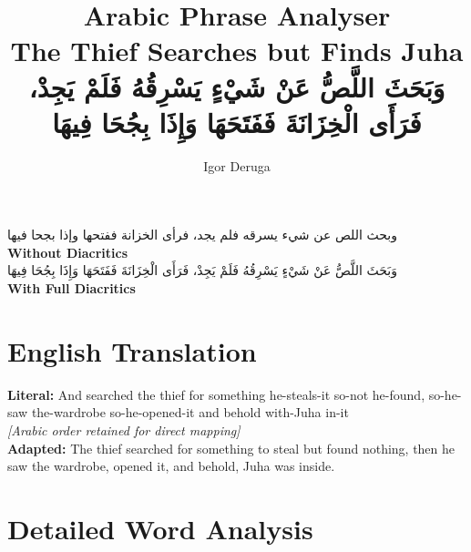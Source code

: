 \documentclass[letter,12pt]{article}
\begin{document}
\title{\textbf{\Large Arabic Phrase Analyser}\\
\large The Thief Searches but Finds Juha\\
\normalsize \textarabic{وَبَحَثَ اللَّصُّ عَنْ شَيْءٍ يَسْرِقُهُ فَلَمْ يَجِدْ، فَرَأَى الْخِزَانَةَ فَفَتَحَهَا وَإِذَا بِجُحَا فِيهَا}}
\author{Igor Deruga}
\date{}
\maketitle

\begin{tcolorbox}[colback=boxcolor,colframe=headercolor,title=\textbf{Arabic Phrase},breakable]
\centering
\textarabic{وبحث اللص عن شيء يسرقه فلم يجد، فرأى الخزانة ففتحها وإذا بجحا فيها}
\\[0.5em]
\textbf{Without Diacritics}
\\[1em]
\textarabic{وَبَحَثَ اللَّصُّ عَنْ شَيْءٍ يَسْرِقُهُ فَلَمْ يَجِدْ، فَرَأَى الْخِزَانَةَ فَفَتَحَهَا وَإِذَا بِجُحَا فِيهَا}
\\[0.5em]
\textbf{With Full Diacritics}
\end{tcolorbox}

\section{English Translation}
\begin{tcolorbox}[colback=white,colframe=accentcolor,breakable]
\textbf{Literal:} And searched the thief for something he-steals-it so-not he-found, so-he-saw the-wardrobe so-he-opened-it and behold with-Juha in-it \\
\textit{[Arabic order retained for direct mapping]}\\[0.5em]
\textbf{Adapted:} The thief searched for something to steal but found nothing, then he saw the wardrobe, opened it, and behold, Juha was inside.
\end{tcolorbox}

\section{Detailed Word Analysis}
\end{document}
